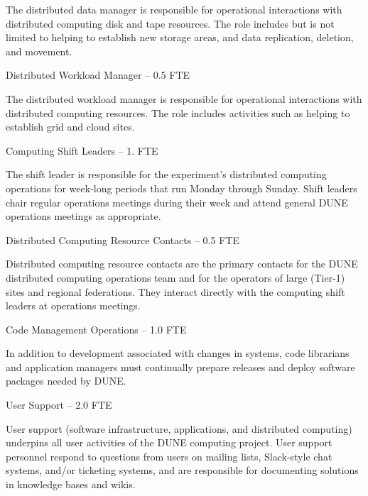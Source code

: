 \documentclass[../main-v1.tex]{subfiles}
\begin{document}
\begin{description}
The distributed data manager is responsible for operational interactions with distributed computing disk and tape resources. The role includes but is not limited to helping to establish new storage areas, and data replication, deletion, and movement. 

\item {Distributed Workload Manager -- 0.5 FTE}

The distributed workload manager is responsible for operational interactions with distributed computing resources. The role includes activities such as helping to establish grid and cloud sites. 


\item {Computing Shift Leaders -- 1. FTE}

The shift leader is %
responsible for the experiment's distributed computing operations for %
week-long periods that run Monday through Sunday.  %
Shift leaders chair regular operations meetings during their week and attend general DUNE operations meetings as appropriate. %

\item {Distributed Computing Resource Contacts -- 0.5 FTE}

Distributed computing resource contacts are the primary contacts for the DUNE distributed computing operations team and for the operators of large (Tier-1) sites and regional federations. They interact directly with the computing shift leaders at operations meetings. 


\item {Code Management Operations -- 1.0 FTE}

In addition to development associated with changes in systems, code librarians and application managers must continually prepare releases and %
deploy  software packages needed by DUNE.  

\item {User Support -- 2.0 FTE}

User support (software infrastructure, applications, and distributed computing) underpins all user activities of the DUNE computing project. 
User support %
personnel %
respond to questions from users on mailing lists, Slack-style chat systems, and/or ticketing systems, %
and are responsible for documenting solutions in knowledge bases and wikis. 


\end{description}
\end{document}
